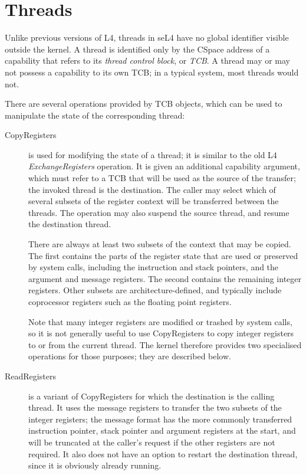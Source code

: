 \section[threads]{Threads}

Unlike previous versions of L4, threads in seL4 have no global identifier
visible outside the kernel. A thread is identified only by the CSpace address
of a capability that refers to its \emph{thread control block}, or \emph{TCB}.
A thread may or may not possess a capability to its own TCB; in a typical
system, most threads would not.

There are several operations provided by TCB objects, which can be used to
manipulate the state of the corresponding thread:

\begin{description}
\item [CopyRegisters] is used for modifying the state of a thread; it is similar to the old L4 \emph{ExchangeRegisters} operation. It is given an additional capability argument, which must refer to a TCB that will be used as the source of the transfer; the invoked thread is the destination. The caller may select which of several subsets of the register context will be transferred between the threads. The operation may also suspend the source thread, and resume the destination thread.

There are always at least two subsets of the context that may be copied. The first contains the parts of the register state that are used or preserved by system calls, including the instruction and stack pointers, and the argument and message registers. The second contains the remaining integer registers. Other subsets are architecture-defined, and typically include coprocessor registers such as the floating point registers.

Note that many integer registers are modified or trashed by system calls, so it is not generally useful to use CopyRegisters to copy integer registers to or from the current thread. The kernel therefore provides two specialised operations for those purposes; they are described below.

\item [ReadRegisters] is a variant of CopyRegisters for which the destination is the calling thread. It uses the message registers to transfer the two subsets of the integer registers; the message format has the more commonly transferred instruction pointer, stack pointer and argument registers at the start, and will be truncated at the caller's request if the other registers are not required. It also does not have an option to restart the destination thread, since it is obviously already running.


\end{description}

